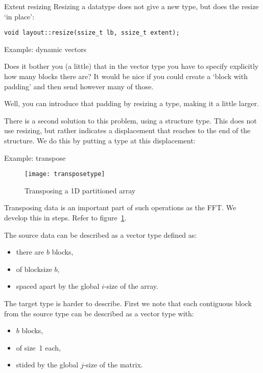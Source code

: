 \begin{mplnote}{Extent resizing}
  Resizing a datatype does not give a new type, but
  does the resize `in place':
\begin{lstlisting}
void layout::resize(ssize_t lb, ssize_t extent);
\end{lstlisting}
\end{mplnote}

 {Example: dynamic vectors}

Does it bother you (a little) that in the vector type you
have to specify explicitly how many blocks there are?
It would be nice if you could create a `block with padding'
and then send however many of those.

Well, you can introduce that padding by resizing a type,
making it a little larger.


There is a second solution to this problem, using a structure type.
This does not use resizing, but rather indicates a displacement
that reaches to the end of the structure. We do this
by putting a type  at this displacement:


 {Example: transpose}

\begin{figure}[ht]
  \texttt{[image: transposetype]}
  \caption{Transposing a 1D partitioned array}
  \label{fig:transposetype} 
\end{figure}
Transposing data is an important part of such operations as the \ac{FFT}.
We develop this in steps. Refer to figure~\ref{fig:transposetype}.

The source data can be described as a vector type defined as:
\begin{itemize}
\item there are $b$ blocks,
\item of blocksize $b$,
\item spaced apart by the global $i$-size of the array.
\end{itemize}

The target type is harder to describe.
First we note that each contiguous block from the source type
can be described as a vector type with:
\begin{itemize}
\item $b$ blocks,
\item of size~1 each,
\item stided by the global $j$-size of the matrix.
\end{itemize}
%

